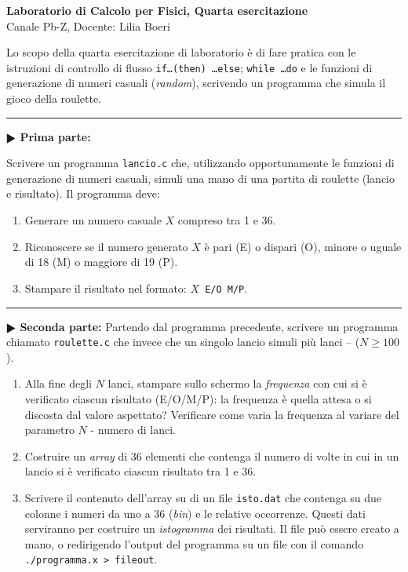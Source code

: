 \documentclass[11pt]{article}
\begin{document}
\pagestyle{empty}

\begin{center}
{\Large \bf  Laboratorio di Calcolo per Fisici, Quarta esercitazione\\[2mm]}
{\large Canale Pb-Z, Docente: Lilia Boeri}
\end{center}
\vspace{4mm}

\begin{mdframed}[backgroundcolor=panna]
  Lo scopo della quarta esercitazione di laboratorio \`e di fare pratica con
  le istruzioni di controllo di flusso \texttt{if\ldots (then) \ldots else}; \texttt{while \ldots do} e le funzioni di generazione di numeri casuali ({\em random}), scrivendo un programma che simula il gioco della roulette.
  \end{mdframed}
%
%



\hrule
\vspace{2mm}
\textbf{$\RHD$ Prima parte:}

Scrivere un programma \texttt{lancio.c} che, utilizzando opportunamente le
funzioni di generazione di numeri casuali, simuli una mano di una partita di
roulette (lancio e risultato). Il programma deve:
\begin{enumerate}
\item Generare un numero casuale $X$ compreso tra 1 e 36.
\item Riconoscere se il numero generato $X$ \`e pari (E) o dispari (O), minore
o uguale di 18 (M) o maggiore di 19 (P).
\item Stampare il risultato nel formato: \texttt{$X$ E/O M/P}.
\end{enumerate}

\hrule
\vspace{2mm}
\textbf{$\RHD$ Seconda parte:}
Partendo dal programma precedente, scrivere un programma chiamato \texttt{roulette.c} che
invece che un singolo lancio simuli pi\`u lanci --  ($N \ge 100$).
\begin{enumerate}
\item Alla fine degli $N$ lanci, stampare sullo schermo la {\em frequenza}
con cui si \`e verificato ciascun risultato (E/O/M/P): la frequenza
\`e quella attesa o si discosta dal valore aspettato? Verificare come
varia la frequenza al variare del parametro $N$ - numero di lanci.
\item Costruire un {\em array} di 36 elementi che contenga il numero di
volte in cui  in un lancio  si \`e verificato ciascun risultato tra 1 e 36.
\item Scrivere il contenuto dell'array su di un file
  \texttt{isto.dat} che contenga
su due colonne i numeri da uno a 36 ({\em bin}) e le relative occorrenze.
Questi dati serviranno per costruire un {\em istogramma} dei risultati.
Il file pu\`o essere creato a mano, o redirigendo l'output del programma
su un file con il comando \texttt{./programma.x > fileout}.
\end{enumerate}
\end{document}
